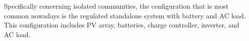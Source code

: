 \documentclass[journal]{IEEEtran}
\begin{document}
Specifically concerning isolated communities, 
the configuration that is most common nowadays is the regulated standalone system with battery and AC load. This configuration includes PV array, batteries, charge controller, inverter, and AC load.

 

\end{document}
